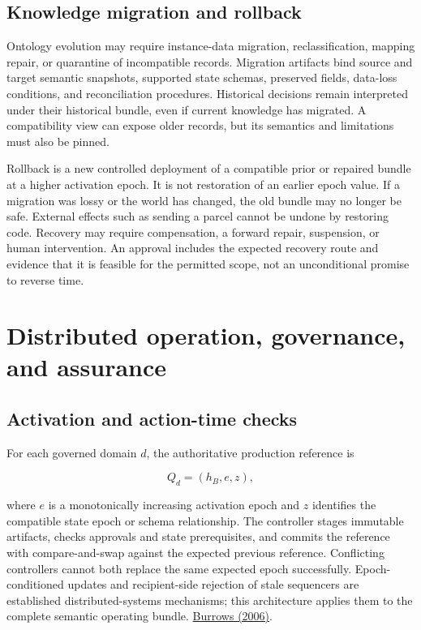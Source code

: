 \documentclass[preprint,12pt,authoryear]{elsarticle}
\begin{document}
\subsection{Knowledge migration and
rollback}\label{knowledge-migration-and-rollback}

Ontology evolution may require instance-data migration,
reclassification, mapping repair, or quarantine of incompatible records.
Migration artifacts bind source and target semantic snapshots, supported
state schemas, preserved fields, data-loss conditions, and
reconciliation procedures. Historical decisions remain interpreted under
their historical bundle, even if current knowledge has migrated. A
compatibility view can expose older records, but its semantics and
limitations must also be pinned.

Rollback is a new controlled deployment of a compatible prior or
repaired bundle at a higher activation epoch. It is not restoration of
an earlier epoch value. If a migration was lossy or the world has
changed, the old bundle may no longer be safe. External effects such as
sending a parcel cannot be undone by restoring code. Recovery may
require compensation, a forward repair, suspension, or human
intervention. An approval includes the expected recovery route and
evidence that it is feasible for the permitted scope, not an
unconditional promise to reverse time.

\section{Distributed operation, governance, and
assurance}\label{distributed-operation-governance-and-assurance}

\subsection{Activation and action-time
checks}\label{activation-and-action-time-checks}

For each governed domain \(d\), the authoritative production reference
is

\[Q_d=(h_B,e,z),\]

where \(e\) is a monotonically increasing activation epoch and \(z\)
identifies the compatible state epoch or schema relationship. The
controller stages immutable artifacts, checks approvals and state
prerequisites, and commits the reference with compare-and-swap against
the expected previous reference. Conflicting controllers cannot both
replace the same expected epoch successfully. Epoch-conditioned updates
and recipient-side rejection of stale sequencers are established
distributed-systems mechanisms; this architecture applies them to the
complete semantic operating bundle.
\href{https://www.usenix.org/legacy/events/osdi06/tech/full_papers/burrows/burrows_html/index.html}{Burrows
(2006)}.
\end{document}
